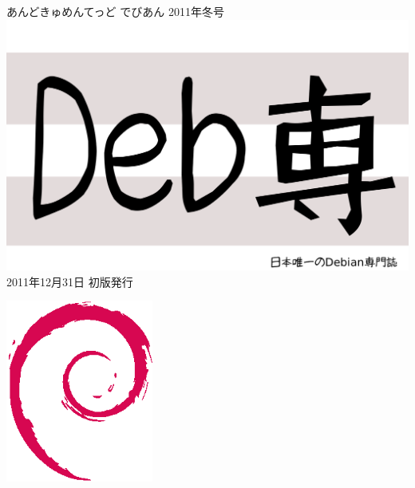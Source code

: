 \documentclass[mingoth,a4paper]{jsarticle}
\begin{document}
\begin{titlepage}
\thispagestyle{empty}

\vspace*{-2cm}
あんどきゅめんてっど でびあん 2011年冬号\\
\hspace*{-2cm}
\includegraphics[width=210mm]{image2011-fuyu/debsen.pdf}\\
\hfill 2011年12月31日 初版発行



\vspace*{-2cm}
\hfill{}\includegraphics[height=6cm]{image200502/openlogo-nd.eps}
\end{titlepage}

\newpage
\thispagestyle{empty}\mbox{}
\newpage
\end{document}
